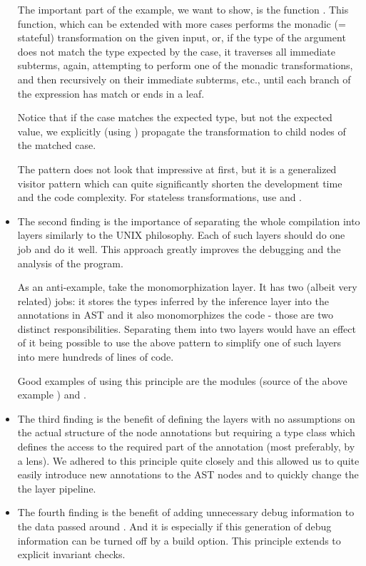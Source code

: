 \begin{itemize}
\begin{ex}
        The important part of the example, we want to show, is the function \linebreak {}. This function, which can be extended with more  cases performs the monadic (= stateful) transformation  on the given input, or, if the type of the argument does not match the type expected by the case, it traverses all immediate subterms, again, attempting to perform one of the monadic transformations, and then recursively on their immediate subterms, etc., until each branch of the expression has match or ends in a leaf.

        Notice that if the case matches the expected type, but not the expected value, we explicitly (using ) propagate the transformation to child nodes of the matched case.
    \end{ex}

    The  pattern does not look that impressive at first, but it is a generalized visitor pattern which can quite significantly shorten the development time and the code complexity. For stateless transformations, use  and .

    \item The second finding is the importance of separating the whole compilation into layers similarly to the UNIX philosophy. Each of such layers should do one job and do it well. This approach greatly improves the debugging and the analysis of the program.

    As an anti-example, take the monomorphization layer. It has two (albeit very related) jobs: it stores the types inferred by the inference layer into the annotations in AST and it also monomorphizes the code - those are two distinct responsibilities. Separating them into two layers would have an effect of it being possible to use the above pattern to simplify one of such layers into mere hundreds of lines of code.

    Good examples of using this principle are the modules  (source of the above example ) and .

    \item The third finding is the benefit of defining the layers with no assumptions on the actual structure of the node annotations but requiring a type class which defines the access to the required part of the annotation (most preferably, by a lens). We adhered to this principle quite closely and this allowed us to quite easily introduce new annotations to the AST nodes and to quickly change the the layer pipeline.

    \item The fourth finding is the benefit of adding unnecessary debug information to the data passed around . And it is especially if this generation of debug information can be turned off by a build option. This principle extends to explicit invariant checks.

\end{itemize}
